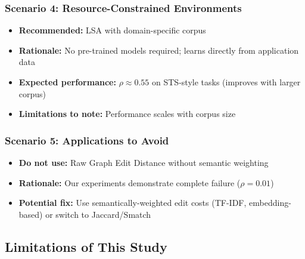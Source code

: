 \documentclass[11pt,a4paper]{article}
\begin{document}
\subsubsection{Scenario 4: Resource-Constrained Environments}
\begin{itemize}
    \item \textbf{Recommended:} LSA with domain-specific corpus
    \item \textbf{Rationale:} No pre-trained models required; learns directly from application data
    \item \textbf{Expected performance:} $\rho \approx 0.55$ on STS-style tasks (improves with larger corpus)
    \item \textbf{Limitations to note:} Performance scales with corpus size
\end{itemize}

\subsubsection{Scenario 5: Applications to Avoid}
\begin{itemize}
    \item \textbf{Do not use:} Raw Graph Edit Distance without semantic weighting
    \item \textbf{Rationale:} Our experiments demonstrate complete failure ($\rho = 0.01$)
    \item \textbf{Potential fix:} Use semantically-weighted edit costs (TF-IDF, embedding-based) or switch to Jaccard/Smatch
\end{itemize}

\subsection{Limitations of This Study}
\end{document}
